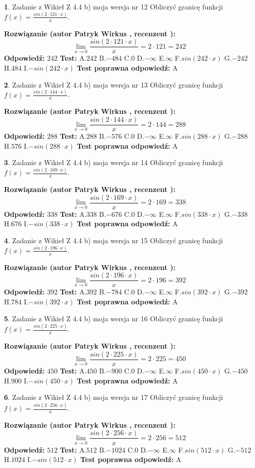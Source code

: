 \documentclass[12pt, a4paper]{article}
\theoremstyle{definition} %
\newtheorem{zad}{}
\newcommand{\zadStart}[1]{\begin{zad}#1\newline}
\newcommand{\zadStop}{\end{zad}}
\newcommand{\rozwStart}[2]{\noindent \textbf{Rozwiązanie (autor #1 , recenzent #2): }\newline}
\newcommand{\rozwStop}{\newline}
\newcommand{\odpStart}{\noindent \textbf{Odpowiedź:}\newline}
\newcommand{\odpStop}{\newline}
\newcommand{\testStart}{\noindent \textbf{Test:}\newline}
\newcommand{\testStop}{\newline}
\newcommand{\kluczStart}{\noindent \textbf{Test poprawna odpowiedź:}\newline}
\newcommand{\kluczStop}{\newline}
\begin{document}
\zadStart{Zadanie z Wikieł Z 4.4 b) moja wersja nr 12}
Obliczyć granicę funkcji $f(x)=\frac{sin(2 \cdot121\cdot x)}{x}$.
\zadStop
\rozwStart{Patryk Wirkus}{}
$$\lim\limits_{x\to 0}\frac{sin(2 \cdot 121\cdot x)}{x}=
2 \cdot 121 = 242$$
\rozwStop
\odpStart
$242$
\odpStop
\testStart
A.$242$
B.$-484$
C.$0$
D.$-\infty$
E.$\infty$
F.$sin(242\cdot x)$
G.$-242$
H.$484$
I.$-sin(242\cdot x)$
\testStop
\kluczStart
A
\kluczStop



\zadStart{Zadanie z Wikieł Z 4.4 b) moja wersja nr 13}
Obliczyć granicę funkcji $f(x)=\frac{sin(2 \cdot144\cdot x)}{x}$.
\zadStop
\rozwStart{Patryk Wirkus}{}
$$\lim\limits_{x\to 0}\frac{sin(2 \cdot 144\cdot x)}{x}=
2 \cdot 144 = 288$$
\rozwStop
\odpStart
$288$
\odpStop
\testStart
A.$288$
B.$-576$
C.$0$
D.$-\infty$
E.$\infty$
F.$sin(288\cdot x)$
G.$-288$
H.$576$
I.$-sin(288\cdot x)$
\testStop
\kluczStart
A
\kluczStop



\zadStart{Zadanie z Wikieł Z 4.4 b) moja wersja nr 14}
Obliczyć granicę funkcji $f(x)=\frac{sin(2 \cdot169\cdot x)}{x}$.
\zadStop
\rozwStart{Patryk Wirkus}{}
$$\lim\limits_{x\to 0}\frac{sin(2 \cdot 169\cdot x)}{x}=
2 \cdot 169 = 338$$
\rozwStop
\odpStart
$338$
\odpStop
\testStart
A.$338$
B.$-676$
C.$0$
D.$-\infty$
E.$\infty$
F.$sin(338\cdot x)$
G.$-338$
H.$676$
I.$-sin(338\cdot x)$
\testStop
\kluczStart
A
\kluczStop



\zadStart{Zadanie z Wikieł Z 4.4 b) moja wersja nr 15}
Obliczyć granicę funkcji $f(x)=\frac{sin(2 \cdot196\cdot x)}{x}$.
\zadStop
\rozwStart{Patryk Wirkus}{}
$$\lim\limits_{x\to 0}\frac{sin(2 \cdot 196\cdot x)}{x}=
2 \cdot 196 = 392$$
\rozwStop
\odpStart
$392$
\odpStop
\testStart
A.$392$
B.$-784$
C.$0$
D.$-\infty$
E.$\infty$
F.$sin(392\cdot x)$
G.$-392$
H.$784$
I.$-sin(392\cdot x)$
\testStop
\kluczStart
A
\kluczStop



\zadStart{Zadanie z Wikieł Z 4.4 b) moja wersja nr 16}
Obliczyć granicę funkcji $f(x)=\frac{sin(2 \cdot225\cdot x)}{x}$.
\zadStop
\rozwStart{Patryk Wirkus}{}
$$\lim\limits_{x\to 0}\frac{sin(2 \cdot 225\cdot x)}{x}=
2 \cdot 225 = 450$$
\rozwStop
\odpStart
$450$
\odpStop
\testStart
A.$450$
B.$-900$
C.$0$
D.$-\infty$
E.$\infty$
F.$sin(450\cdot x)$
G.$-450$
H.$900$
I.$-sin(450\cdot x)$
\testStop
\kluczStart
A
\kluczStop



\zadStart{Zadanie z Wikieł Z 4.4 b) moja wersja nr 17}
Obliczyć granicę funkcji $f(x)=\frac{sin(2 \cdot256\cdot x)}{x}$.
\zadStop
\rozwStart{Patryk Wirkus}{}
$$\lim\limits_{x\to 0}\frac{sin(2 \cdot 256\cdot x)}{x}=
2 \cdot 256 = 512$$
\rozwStop
\odpStart
$512$
\odpStop
\testStart
A.$512$
B.$-1024$
C.$0$
D.$-\infty$
E.$\infty$
F.$sin(512\cdot x)$
G.$-512$
H.$1024$
I.$-sin(512\cdot x)$
\testStop
\kluczStart
A
\kluczStop
\end{document}
